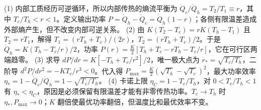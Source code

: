 (1) 内部工质经历可逆循环，所以内部传热的熵流平衡为 \(\dot Q_c/\dot Q_h=T_2/T_1\equiv r\)，其中 \(T_c/T_h<r<1\)。定义输出功率 \(P=\dot Q_h-\dot Q_c=\dot Q_h(1-r)\)；各侧有限温差造成外部熵产生，但不改变内部可逆关系。
(2) 由 \(K(T_2-T_c)=rK(T_h-T_1)\) 且 \(T_2=rT_1\)，解得 \(T_1=(rT_h+T_c)/(2r)\)，\(T_2=(rT_h+T_c)/2\)。于是 \(\dot Q_h=K(T_h-T_c/r)/2\)，功率 \(P(r)=\frac K2[T_h+T_c-rT_h-T_c/r]\)，它在可行区两端趋零。
(3) 求导 \(dP/dr=K[-T_h+T_c/r^2]/2\)，唯一极大点为 \(r_*=\sqrt{T_c/T_h}\)，二阶导 \(d^2P/dr^2=-KT_c/r^3<0\)。代入得 \(P_{\max}=\frac K2(\sqrt{T_h}-\sqrt{T_c})^2\)，最大功率效率 \(\eta_*=1-\dot Q_c/\dot Q_h=1-\sqrt{T_c/T_h}\)。
(4) 卡诺上限 \(\eta_C=1-T_c/T_h\)，对 \(0<T_c/T_h<1\) 有 \(\eta_*<\eta_C\)，原因是必须保留有限温差才能有非零传热功率。\(T_c\to T_h\) 时 \(\eta_*,P_{\max}\to0\)；\(K\) 翻倍使最优功率翻倍，但温度比和最优效率不变。
